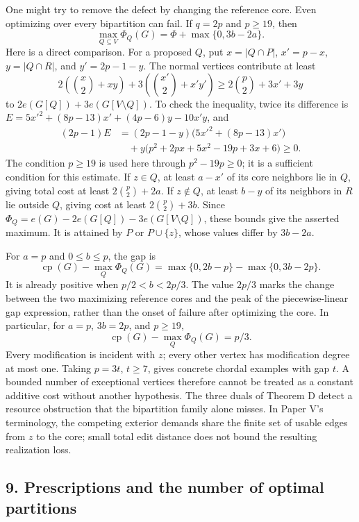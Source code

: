 \documentclass[english,11pt,a4paper]{article}
\begin{document}
One might try to remove the defect by changing the reference core. Even
optimizing over every bipartition can fail. If \(q=2p\) and \(p\ge19\),
then \[
\max_{Q\subseteq V}\Phi_Q(G)=\Phi+\max\{0,3b-2a\}.
\] Here is a direct comparison. For a proposed \(Q\), put
\(x=|Q\cap P|\), \(x'=p-x\), \(y=|Q\cap R|\), and \(y'=2p-1-y\). The
normal vertices contribute at least \[
2\left(\binom x2+xy\right)
+3\left(\binom{x'}2+x'y'\right)
\ge 2\binom p2+3x'+3y
\] to \(2e(G[Q])+3e(G[V\setminus Q])\). To check the inequality, twice
its difference is \(E=5x'^2+(8p-13)x'+(4p-6)y-10x'y\), and \[
\begin{aligned}
(2p-1)E&=(2p-1-y)\bigl(5x'^2+(8p-13)x'\bigr)\\
&\quad+y\bigl(p^2+2px+5x^2-19p+3x+6\bigr)\ge0.
\end{aligned}
\] The condition \(p\ge19\) is used here through \(p^2-19p\ge0\); it is
a sufficient condition for this estimate. If \(z\in Q\), at least
\(a-x'\) of its core neighbors lie in \(Q\), giving total cost at least
\(2\binom p2+2a\). If \(z\notin Q\), at least \(b-y\) of its neighbors
in \(R\) lie outside \(Q\), giving cost at least \(2\binom p2+3b\).
Since \(\Phi_Q=e(G)-2e(G[Q])-3e(G[V\setminus Q])\), these bounds give
the asserted maximum. It is attained by \(P\) or \(P\cup\{z\}\), whose
values differ by \(3b-2a\).

For \(a=p\) and \(0\le b\le p\), the gap is \[
\operatorname{cp}(G)-\max_Q\Phi_Q(G)
=\max\{0,2b-p\}-\max\{0,3b-2p\}.
\] It is already positive when \(p/2<b<2p/3\). The value \(2p/3\) marks
the change between the two maximizing reference cores and the peak of
the piecewise-linear gap expression, rather than the onset of failure
after optimizing the core. In particular, for \(a=p\), \(3b=2p\), and
\(p\ge19\), \[
\operatorname{cp}(G)-\max_Q\Phi_Q(G)=p/3.
\] Every modification is incident with \(z\); every other vertex has
modification degree at most one. Taking \(p=3t\), \(t\ge7\), gives
concrete chordal examples with gap \(t\). A bounded number of
exceptional vertices therefore cannot be treated as a constant additive
cost without another hypothesis. The three duals of Theorem D detect a
resource obstruction that the bipartition family alone misses. In Paper
V's terminology, the competing exterior demands share the finite set of
usable edges from \(z\) to the core; small total edit distance does not
bound the resulting realization loss.

\subsection{9. Prescriptions and the number of optimal
partitions}\label{prescriptions-and-the-number-of-optimal-partitions}
\end{document}
